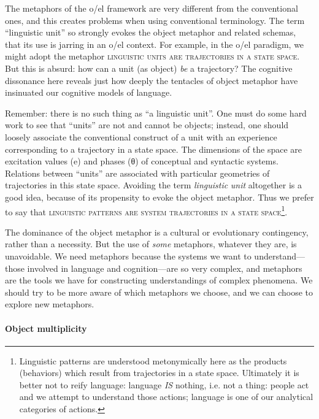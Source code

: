   The metaphors of the o/el framework are very different from the conventional ones, and this creates problems when using conventional terminology. The term “linguistic unit” so strongly evokes the object metaphor and related schemas, that its use is jarring in an o/el context. For example, in the o/el paradigm, we might adopt the metaphor \textsc{linguistic} \textsc{units} \textsc{are} \textsc{trajectories} \textsc{in} \textsc{a} \textsc{state} \textsc{space}. But this is absurd: how can a unit (as object) \textit{be} a trajectory? The cognitive dissonance here reveals just how deeply the tentacles of object metaphor have insinuated our cognitive models of language.

  Remember: there is no such thing as “a linguistic unit”. One must do some hard work to see that “units” are not and cannot be objects; instead, one should loosely associate the conventional construct of a unit with an experience corresponding to a trajectory in a state space. The dimensions of the space are excitation values (e) and phases (θ) of conceptual and syntactic systems. Relations between “units” are associated with particular geometries of trajectories in this state space. Avoiding the term \textit{linguistic} \textit{unit} altogether is a good idea, because of its propensity to evoke the object metaphor. Thus we prefer to say that \textsc{linguistic} \textsc{patterns} \textsc{are} \textsc{system} \textsc{trajectories} \textsc{in} \textsc{a} \textsc{state} \textsc{space}\footnote{Linguistic patterns are understood metonymically here as the products (behaviors) which result from trajectories in a state space. Ultimately it is better not to reify language: language \textit{IS} nothing, i.e. not a thing: people act and we attempt to understand those actions; language is one of our analytical categories of actions.}.

  The dominance of the object metaphor is a cultural or evolutionary contingency, rather than a necessity. But the use of \textit{some} metaphors, whatever they are, is unavoidable. We need metaphors because the systems we want to understand—those involved in language and cognition—are so very complex, and metaphors are the tools we have for constructing understandings of complex phenomena. We should try to be more aware of which metaphors we choose, and we can choose to explore new metaphors.

\paragraph{Object multiplicity}

